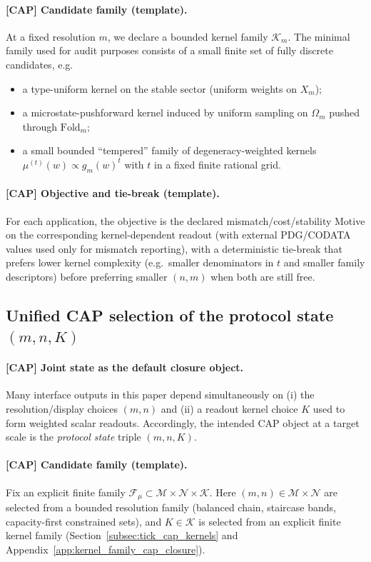 \paragraph{[CAP] Candidate family (template).}
At a fixed resolution $m$, we declare a bounded kernel family $\mathcal{K}_m$.
The minimal family used for audit purposes consists of a small finite set of fully discrete candidates, e.g.\
\begin{itemize}
\item a type-uniform kernel on the stable sector (uniform weights on $X_m$);
\item a microstate-pushforward kernel induced by uniform sampling on $\Omega_m$ pushed through $\mathrm{Fold}_m$;
\item a small bounded ``tempered'' family of degeneracy-weighted kernels $\mu^{(t)}(w)\propto g_m(w)^t$ with $t$ in a fixed finite rational grid.
\end{itemize}

\paragraph{[CAP] Objective and tie-break (template).}
For each application, the objective is the declared mismatch/cost/stability Motive on the corresponding kernel-dependent readout (with external PDG/CODATA values used only for mismatch reporting), with a deterministic tie-break that prefers lower kernel complexity (e.g.\ smaller denominators in $t$ and smaller family descriptors) before preferring smaller $(n,m)$ when both are still free.

\subsection{Unified CAP selection of the protocol state \texorpdfstring{$(m,n,K)$}{(m,n,K)}}
\label{subsec:tick_cap_joint_protocol_state}

\paragraph{[CAP] Joint state as the default closure object.}
\InterfaceTag Many interface outputs in this paper depend simultaneously on (i) the resolution/display choices $(m,n)$ and (ii) a readout kernel choice $K$ used to form weighted scalar readouts.
Accordingly, the intended CAP object at a target scale is the \emph{protocol state} triple $(m,n,K)$.

\paragraph{[CAP] Candidate family (template).}
\AuditTag Fix an explicit finite family $\mathcal{F}_\mu\subset \mathcal{M}\times\mathcal{N}\times\mathcal{K}$.
Here $(m,n)\in\mathcal{M}\times\mathcal{N}$ are selected from a bounded resolution family (balanced chain, staircase bands, capacity-first constrained sets), and $K\in\mathcal{K}$ is selected from an explicit finite kernel family (Section~\ref{subsec:tick_cap_kernels} and Appendix~\ref{app:kernel_family_cap_closure}).

